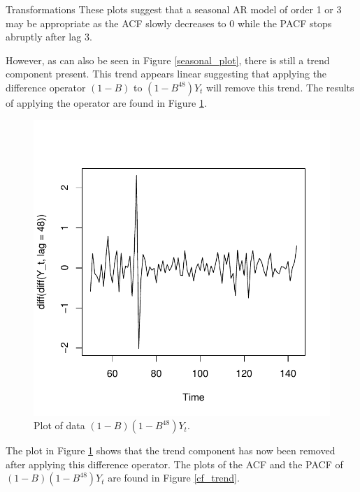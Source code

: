 \begin{subsection}{Transformations}
  These plots suggest that a seasonal AR model of order 1 or 3 may be
  appropriate as the ACF slowly decreases to 0 while the PACF stops abruptly
  after lag 3.

  However, as can also be seen in Figure \ref{seasonal_plot}, there is still a
  trend component present. This trend appears linear suggesting that applying
  the difference operator $(1 - B)$ to $\left(1 - B^{48}\right)Y_t$ will remove
  this trend. The results of applying the operator are found in Figure \ref{trend_plot}.

  \begin{figure}[!h]
    \centerline{\includegraphics[scale=0.75]{../analysis/plots/trend_plot}}
    \caption{Plot of data $(1-B)\left(1 - B^{48}\right)Y_t$.}\label{trend_plot}
  \end{figure}

  The plot in Figure \ref{trend_plot} shows that the trend component has now been removed after applying this difference operator.
  The plots of the ACF and the PACF of
  $(1-B)\left(1 - B^{48}\right)Y_t$ are found in Figure \ref{cf_trend}.


\end{subsection}
